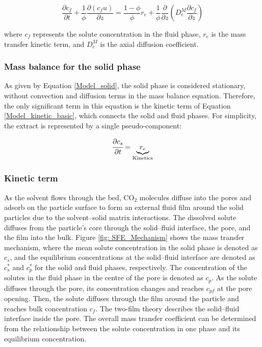 \documentclass[a4paper,fleqn]{cas-dc}
\begin{document}
	{\footnotesize
		\begin{equation}
			\label{Model_fluid}
			\frac{\partial c_f}{\partial t}
			+ \frac{1}{\phi} \frac{\partial \left( c_f u\right)}{\partial z}
			= \frac{1-\phi}{\phi} r_e
			+ \frac{1}{\phi} \frac{\partial}{\partial z} \left( D^M_e \frac{\partial c_f}{\partial z} \right)
		\end{equation}
	}
	
	where $c_f$ represents the solute concentration in the fluid phase, $r_e$ is the mass transfer kinetic term, and $D^M_e$ is the axial diffusion coefficient.
	
	\subsubsection{Mass balance for the solid phase} \label{Mass_balance_solid}
	
	As given by Equation \ref{Model_solid}, the solid phase is considered stationary, without convection and diffusion terms in the mass balance equation. Therefore, the only significant term in this equation is the kinetic term of Equation \ref{Model_kinetic_basic}, which connects the solid and fluid phases. For simplicity, the extract is represented by a single pseudo-component: 
	
	{\footnotesize
		\begin{equation} 
			\label{Model_solid}
					\cfrac{\partial c_s}{\partial t} = \underbrace{ r_e }_{\text{Kinetics}}
			\end{equation} }
			
			\subsubsection{Kinetic term} \label{CH: Kinetic}
			
			As the solvent flows through the bed, CO$_2$ molecules diffuse into the pores and adsorb on the particle surface to form an external fluid film around the solid particles due to the solvent--solid matrix interactions. The dissolved solute diffuses from the particle's core through the solid--fluid interface, the pore, and the film into the bulk. Figure \ref{fig: SFE_Mechanism} shows the mass transfer mechanism, where the mean solute concentration in the solid phase is denoted as $c_s$, and the equilibrium concentrations at the solid--fluid interface are denoted as $c_s^*$ and $c_p^*$ for the solid and fluid phases, respectively. The concentration of the solutes in the fluid phase in the centre of the pore is denoted as $c_p$. As the solute diffuses through the pore, its concentration changes and reaches $c_{pf}$ at the pore opening. Then, the solute diffuses through the film around the particle and reaches bulk concentration $c_f$. The two-film theory describes the solid--fluid interface inside the pore. The overall mass transfer coefficient can be determined from the relationship between the solute concentration in one phase and its equilibrium concentration.
			
\end{document}
